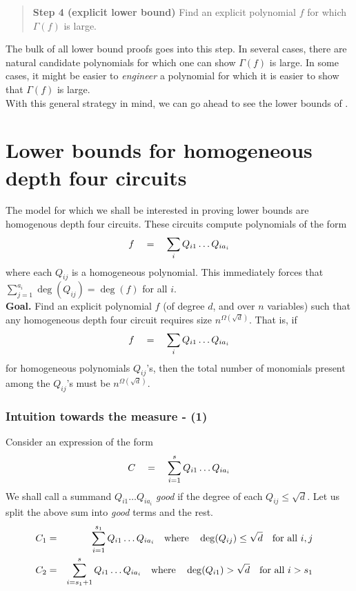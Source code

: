 \documentclass[12pt]{report}
\begin{document}
\begin{quote}
{\bf Step 4 (explicit lower bound)} Find an explicit polynomial $f$ for which $\Gamma(f)$ is large. 
\end{quote} 

The bulk of all lower bound proofs goes into this step. In several cases, there are natural candidate polynomials for which one can show $\Gamma(f)$ is large. In some cases, it might be easier to \emph{engineer} a polynomial for which it is easier to show that $\Gamma(f)$ is large. \\

With this general strategy in mind, we can go ahead to see the lower bounds of \cite{KLSS, KS14}. 

\section{Lower bounds for homogeneous depth four circuits}\label{sec:hom-d4-lb}

The model for which we shall be interested in proving lower bounds are homogenous depth four circuits. These circuits compute polynomials of the form
\[
f \quad = \quad \sum_{i} Q_{i1}\dots Q_{ia_i}
\]
where each $Q_{ij}$ is a homogeneous polynomial. This immediately forces that $\sum_{j=1}^{a_i} \deg(Q_{ij}) = \deg(f)$ for all $i$. \\

{\bf Goal. } Find an explicit polynomial $f$ (of degree $d$, and over $n$ variables) such that any homogeneous depth four circuit requires size $n^{\Omega(\sqrt{d})}$. That is, if
\[
f \quad = \quad \sum_{i} Q_{i1}\dots Q_{ia_i}
\]
for homogeneous polynomials $Q_{ij}$'s, then the total number of monomials present among the $Q_{ij}$'s must be $n^{\Omega(\sqrt{d})}$. 

\subsubsection*{Intuition towards the measure - (1)}

Consider an expression of the form
\[
C \quad = \quad \sum_{i=1}^s Q_{i1}\dots Q_{ia_i}
\]
We shall call a summand $Q_{i1}\dots Q_{ia_i}$ \emph{good} if the degree of each $Q_{ij} \leq \sqrt{d}$. Let us split the above sum into \emph{good} terms and the rest. 
\begin{eqnarray}
C_1 &=& \sum_{i=1}^{s_1} Q_{i1}\dots Q_{ia_i} \quad \text{where} \quad \deg(Q_{ij}) \leq \sqrt{d} \quad \text{for all $i,j$} \quad\label{eqn:int11}\\
C_2 &=& \sum_{i=s_1+1}^{s} Q_{i1}\dots Q_{ia_i} \quad \text{where} \quad \deg(Q_{i1}) > \sqrt{d} \quad \text{for all $i > s_1$} \quad\label{eqn:int12}
\end{eqnarray}
\end{document}
